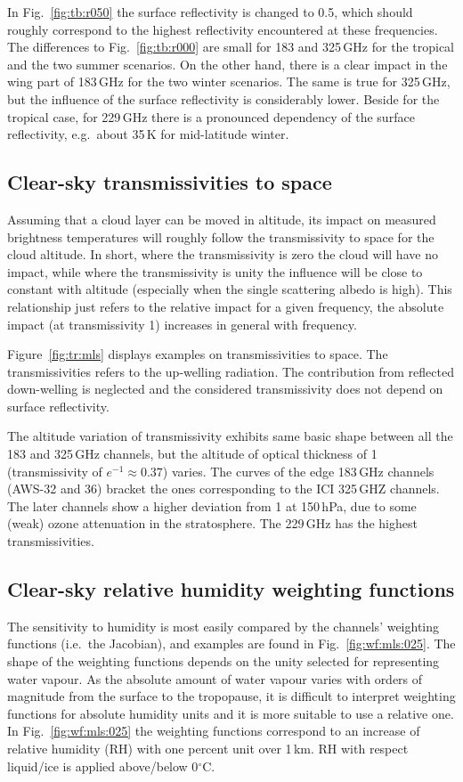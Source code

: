 \documentclass[12pt]{article}
\begin{document}
In Fig.~\ref{fig:tb:r050} the surface reflectivity is changed to 0.5, which
should roughly correspond to the highest reflectivity encountered at these
frequencies. The differences to Fig.~\ref{fig:tb:r000}  are small for 183 and
325\,GHz for the tropical and the two summer scenarios. On the other hand,
there is a clear impact in the wing part of 183\,GHz for the two winter
scenarios. The same is true for 325\,GHz, but the influence of the surface
reflectivity is considerably lower.  Beside for the tropical case, for
229\,GHz there is a pronounced dependency of the surface reflectivity, e.g.\
about 35\,K for mid-latitude winter.


\subsection{Clear-sky transmissivities to space}
%
Assuming that a cloud layer can be moved in altitude, its impact on measured
brightness temperatures will roughly follow the transmissivity to space for the
cloud altitude. In short, where the transmissivity is zero the cloud will have
no impact, while where the transmissivity is unity the influence will be close
to constant with altitude (especially when the single scattering albedo is
high). This relationship just refers to the relative impact for a
given frequency, the absolute impact (at transmissivity 1) increases in general
with frequency. 

Figure~\ref{fig:tr:mls} displays examples on transmissivities to space. The
transmissivities refers to the up-welling radiation. The contribution from
reflected down-welling is neglected and the considered transmissivity does not
depend on surface reflectivity.

The altitude variation of transmissivity exhibits same basic shape between all
the 183 and 325\,GHz channels, but the altitude of optical thickness of 1
(transmissivity of $e^{-1}\approx0.37$) varies. The curves of the edge 183\,GHz
channels (AWS-32 and 36) bracket the ones corresponding to the ICI 325\,GHZ
channels. The later channels show a higher deviation from 1 at 150\,hPa, due to
some (weak) ozone attenuation in the stratosphere. The 229\,GHz has the highest
transmissivities.


\subsection{Clear-sky relative humidity weighting functions}
%
The sensitivity to humidity is most easily compared by the channels' weighting
functions (i.e.\ the Jacobian), and examples are found in
Fig.~\ref{fig:wf:mls:025}. The shape of the weighting functions depends on the
unity selected for representing water vapour. As the absolute amount of water
vapour varies with orders of magnitude from the surface to the tropopause, it
is difficult to interpret weighting functions for absolute humidity units and
it is more suitable to use a relative one. In Fig.~\ref{fig:wf:mls:025} the
weighting functions correspond to an increase of relative humidity (RH) with one
percent unit over 1\,km. RH with respect liquid/ice is applied above/below
0$^\circ$C.
\end{document}
